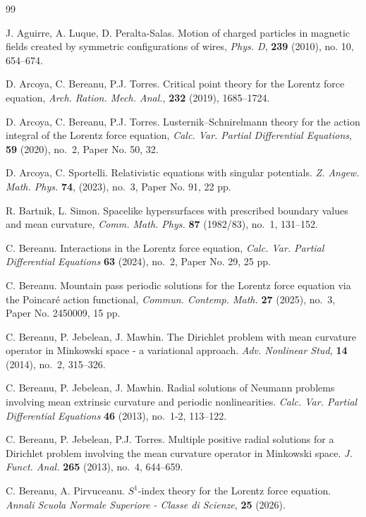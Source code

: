 \documentclass{article}
\theoremstyle{definition}
\begin{document}
		
\begin{thebibliography}{99}

     J. Aguirre, A. Luque, D. Peralta-Salas. Motion of charged particles in magnetic fields created by symmetric configurations of wires, \textsl{Phys. D}, {\bf 239} (2010), no. 10, 654--674.   
			
	 D. Arcoya, C. Bereanu, P.J. Torres. Critical point theory for the Lorentz force equation, \textsl{Arch. Ration. Mech. Anal.}, {\bf 232} (2019), 1685--1724.
			
	 D. Arcoya, C. Bereanu, P.J. Torres. Lusternik–Schnirelmann theory for the action integral of the Lorentz force equation, \textsl{Calc. Var. Partial Differential Equations},  {\bf 59} (2020), no.~2, Paper No. 50, 32.
    
	D. Arcoya, C. Sportelli. Relativistic equations with singular potentials. \textsl{Z. Angew. Math. Phys.} {\bf 74}, (2023), no.~3, Paper No. 91, 22 pp.
    
      R. Bartnik, L. Simon. Spacelike hypersurfaces with prescribed boundary values and mean curvature, \textsl{Comm. Math. Phys.} {\bf 87} (1982/83), no.~1, 131--152.
			
	 C. Bereanu. Interactions in the Lorentz force equation, \textsl{Calc. Var. Partial Differential Equations} {\bf 63} (2024), no.~2, Paper No. 29, 25 pp.
			
	 C. Bereanu. Mountain pass periodic solutions for the Lorentz force equation via the Poincar\'e action functional, \textsl{Commun. Contemp. Math.}  {\bf 27} (2025), no.~3, Paper No. 2450009, 15 pp.

	 C. Bereanu, P. Jebelean, J. Mawhin. The Dirichlet problem with mean curvature operator in Minkowski space - a variational approach. \textsl{Adv. Nonlinear Stud,} {\bf 14} (2014), no.~2, 315--326.

     C. Bereanu, P. Jebelean, J. Mawhin. Radial solutions of Neumann problems involving mean extrinsic curvature and periodic nonlinearities. \textsl{Calc. Var. Partial Differential Equations} {\bf 46} (2013), no.~1-2, 113--122.

      C. Bereanu, P. Jebelean, P.J. Torres. Multiple positive radial solutions for a Dirichlet problem involving the mean curvature operator in Minkowski space. \textsl{J. Funct. Anal.}  {\bf 265} (2013), no.~4, 644--659.
    
	C. Bereanu, A. Pirvuceanu. $S^1$-index theory for the Lorentz force equation. \textsl{Annali Scuola Normale Superiore - Classe di Scienze}, {\bf 25} (2026).		


\end{thebibliography}
\end{document}
